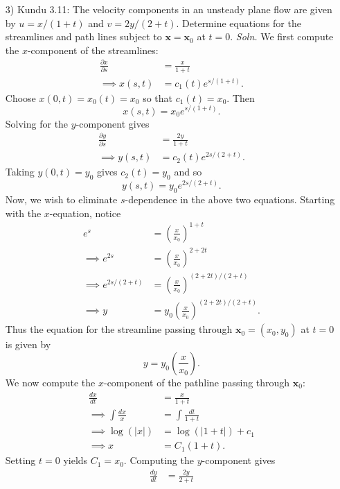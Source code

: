 \documentclass{article}
\begin{document}
\begin{itemize}
    \pagebreak
    \item[3)] Kundu 3.11: The velocity components in an unsteady plane flow are given by $u = x/(1 + t)$ and $v = 2y/(2 + t).$ Determine equations for the streamlines and path lines subject to $\mathbf{x} = \mathbf{x}_0$ at $t = 0$. 
    \newline\newline
    \textit{Soln.} We first compute the $x$-component of the streamlines:
    \begin{align*}
        \frac{\partial x}{\partial s} &= \frac{x}{1 + t}\\
        \implies x(s,t) &= c_1(t)e^{s/(1+t)}.
    \end{align*}
    Choose $x(0,t) = x_0(t) = x_0$ so that $c_1(t) = x_0$. Then
    \[x(s,t) = x_0e^{s/(1+t)}.\]
    Solving for the $y$-component gives
    \begin{align*}
        \frac{\partial y}{\partial s} &= \frac{2y}{1 + t}\\
        \implies y(s,t) &= c_2(t)e^{2s/(2+t)}.
    \end{align*}
    Taking $y(0,t) = y_0$ gives $c_2(t) = y_0$ and so
    \[y(s,t) = y_0e^{2s/(2+t)}.\]
    Now, we wish to eliminate $s$-dependence in the above two equations. Starting with the $x$-equation, notice
    \begin{align*}
    e^s &= \left(\frac{x}{x_0}\right)^{1+t}\\
    \implies e^{2s} &= \left(\frac{x}{x_0}\right)^{2+2t}\\
    \implies e^{2s/(2+t)} &= \left(\frac{x}{x_0}\right)^{(2+2t)/(2+t)}\\
    \implies y &= y_0\left(\frac{x}{x_0}\right)^{(2+2t)/(2+t)}.
    \end{align*}
    Thus the equation for the streamline passing through $\mathbf{x}_0 = (x_0,y_0)$ at $t = 0$ is given by
    \[y = y_0\left(\frac{x}{x_0}\right).\]
    We now compute the $x$-component of the pathline passing through $\mathbf{x}_0$:
    \begin{align*}
        \frac{dx}{dt} &= \frac{x}{1 + t}\\
        \implies \int\frac{dx}{x} &= \int\frac{dt}{1+t}\\
        \implies \log(|x|) &= \log(|1 +t|) + c_1\\
        \implies x &= C_1(1+t).
    \end{align*}
    Setting $t = 0$ yields $C_1 = x_0$. Computing the $y$-component gives
    \begin{align*}
        \frac{dy}{dt} &= \frac{2y}{2 + t}\\

\end{align*}
\end{itemize}
\end{document}
